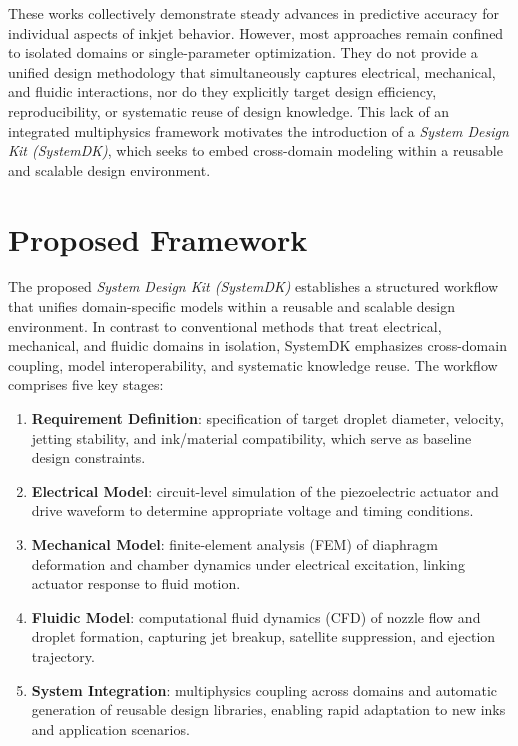 \documentclass[conference]{IEEEtran}
\begin{document}
These works collectively demonstrate steady advances in predictive accuracy for individual aspects of inkjet behavior. 
However, most approaches remain confined to isolated domains or single-parameter optimization. 
They do not provide a unified design methodology that simultaneously captures electrical, mechanical, and fluidic interactions, nor do they explicitly target design efficiency, reproducibility, or systematic reuse of design knowledge. 
This lack of an integrated multiphysics framework motivates the introduction of a \emph{System Design Kit (SystemDK)}, which seeks to embed cross-domain modeling within a reusable and scalable design environment.

\section{Proposed Framework}
The proposed \emph{System Design Kit (SystemDK)} establishes a structured workflow that unifies domain-specific models within a reusable and scalable design environment. 
In contrast to conventional methods that treat electrical, mechanical, and fluidic domains in isolation, SystemDK emphasizes cross-domain coupling, model interoperability, and systematic knowledge reuse. 
The workflow comprises five key stages:

\begin{enumerate}
  \item \textbf{Requirement Definition}: specification of target droplet diameter, velocity, jetting stability, and ink/material compatibility, which serve as baseline design constraints.
  \item \textbf{Electrical Model}: circuit-level simulation of the piezoelectric actuator and drive waveform to determine appropriate voltage and timing conditions.
  \item \textbf{Mechanical Model}: finite-element analysis (FEM) of diaphragm deformation and chamber dynamics under electrical excitation, linking actuator response to fluid motion.
  \item \textbf{Fluidic Model}: computational fluid dynamics (CFD) of nozzle flow and droplet formation, capturing jet breakup, satellite suppression, and ejection trajectory.
  \item \textbf{System Integration}: multiphysics coupling across domains and automatic generation of reusable design libraries, enabling rapid adaptation to new inks and application scenarios.
\end{enumerate}
\end{document}
